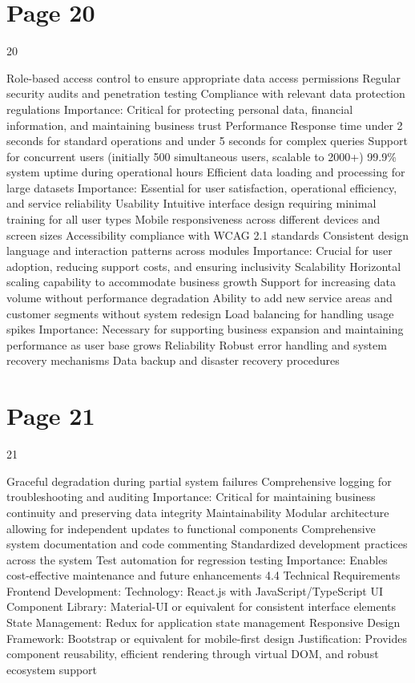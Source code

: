 \documentclass{article}
\begin{document}
\section*{Page 20}
   
 
 20  
 
 Role-based access control to ensure appropriate data access permissions 
 Regular security audits and penetration testing 
     Compliance with relevant data protection regulations 
     Importance: Critical for protecting personal data, financial information, and maintaining      
business trust 
Performance 
     Response time under 2 seconds for standard operations and under 5 seconds for complex 
queries 
     Support for concurrent users (initially 500 simultaneous users, scalable to 2000+) 
     99.9\% system uptime during operational hours 
     Efficient data loading and processing for large datasets 
     Importance: Essential for user satisfaction, operational efficiency, and service reliability 
Usability 
     Intuitive interface design requiring minimal training for all user types 
     Mobile responsiveness across different devices and screen sizes 
     Accessibility compliance with WCAG 2.1 standards 
     Consistent design language and interaction patterns across modules 
     Importance: Crucial for user adoption, reducing support costs, and ensuring inclusivity 
Scalability 
     Horizontal scaling capability to accommodate business growth 
     Support for increasing data volume without performance degradation 
     Ability to add new service areas and customer segments without system redesign 
     Load balancing for handling usage spikes 
     Importance: Necessary for supporting business expansion and maintaining performance as 
user base grows 
Reliability 
     Robust error handling and system recovery mechanisms 
     Data backup and disaster recovery procedures 

\section*{Page 21}
   
 
 21  
 
     Graceful degradation during partial system failures 
     Comprehensive logging for troubleshooting and auditing 
     Importance: Critical for maintaining business continuity and preserving data integrity 
Maintainability 
     Modular architecture allowing for independent updates to functional components 
     Comprehensive system documentation and code commenting 
     Standardized development practices across the system 
     Test automation for regression testing 
     Importance: Enables cost-effective maintenance and future enhancements 
4.4 Technical Requirements 
  Frontend Development: 
     Technology: React.js with JavaScript/TypeScript 
     UI Component Library: Material-UI or equivalent for consistent interface elements 
     State Management: Redux for application state management 
     Responsive Design Framework: Bootstrap or equivalent for mobile-first design 
     Justification: Provides component reusability, efficient rendering through virtual DOM, and 
robust ecosystem support 
 
\end{document}
